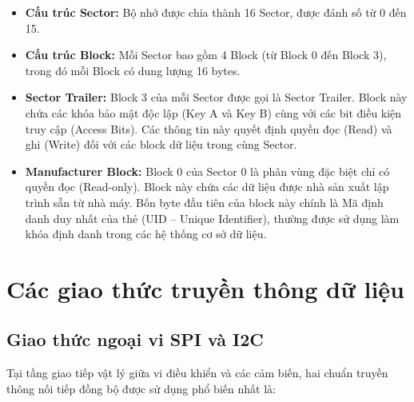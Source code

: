 \documentclass[12pt,a4paper]{report}
\begin{document}
\begin{itemize}

\item \textbf{Cấu trúc Sector:} Bộ nhớ được chia thành 16 Sector, được đánh số từ 0 đến 15.

\item \textbf{Cấu trúc Block:} Mỗi Sector bao gồm 4 Block (từ Block 0 đến Block 3), trong đó mỗi Block có dung lượng 16 bytes.

\item \textbf{Sector Trailer:} Block 3 của mỗi Sector được gọi là Sector Trailer. Block này chứa các khóa bảo mật độc lập (Key A và Key B) cùng với các bit điều kiện truy cập (Access Bits). Các thông tin này quyết định quyền đọc (Read) và ghi (Write) đối với các block dữ liệu trong cùng Sector.

\item \textbf{Manufacturer Block:} Block 0 của Sector 0 là phân vùng đặc biệt chỉ có quyền đọc (Read-only). Block này chứa các dữ liệu được nhà sản xuất lập trình sẵn từ nhà máy. Bốn byte đầu tiên của block này chính là Mã định danh duy nhất của thẻ (UID -- Unique Identifier), thường được sử dụng làm khóa định danh trong các hệ thống cơ sở dữ liệu.

\end{itemize}

\section{Các giao thức truyền thông dữ liệu}

\subsection{Giao thức ngoại vi SPI và I2C}

Tại tầng giao tiếp vật lý giữa vi điều khiển và các cảm biến, hai chuẩn truyền thông nối tiếp đồng bộ được sử dụng phổ biến nhất là:
\end{document}
